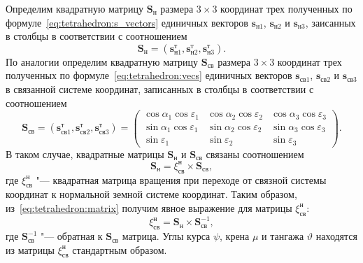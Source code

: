 \documentclass[../main.tex]{subfiles}
\begin{document}
Определим квадратную матрицу $\mathbf{S}_{\text{н}}$ размера $3 \times 3$ координат трех полученных по формуле~\eqref{eq:tetrahedron:s_vectors} единичных векторов $\mathbf{s}_{\text{н}1}$, $\mathbf{s}_{\text{н}2}$ и $\mathbf{s}_{\text{н}3}$, заисанных в столбцы в соответствии с соотношением
\begin{equation*}
    \mathbf{S}_{\text{н}} = \left(\mathbf{s}_{\text{н}1}^\text{т}, \mathbf{s}_{\text{н}2}^\text{т}, \mathbf{s}_{\text{н}3}^\text{т}\right).
\end{equation*}
По аналогии определим квадратную матрицу $\mathbf{S}_{\text{св}}$ размера $3 \times 3$ координат трех полученных по формуле~\eqref{eq:tetrahedron:vecs} единичных векторов $\mathbf{s}_{\text{св}1}$, $\mathbf{s}_{\text{св}2}$ и $\mathbf{s}_{\text{св}3}$ в связанной системе координат, записанных в столбцы в соответствии с соотношением
\begin{equation*}
    \mathbf{S}_{\text{св}} = \left(\mathbf{s}_{\text{св}1}^\text{т}, \mathbf{s}_{\text{св}2}^\text{т}, \mathbf{s}_{\text{св}3}^\text{т}\right) =
    \left(\begin{matrix}
      \cos\alpha_1\cos\varepsilon_1 & \cos\alpha_2\cos\varepsilon_2 & \cos\alpha_3 \cos\varepsilon_3 \\
      \sin\alpha_1\cos\varepsilon_1 & \sin\alpha_2\cos\varepsilon_2 & \sin\alpha_3 \cos\varepsilon_3 \\
      \sin\varepsilon_1 & \sin\varepsilon_2 & \sin\varepsilon_3
    \end{matrix}\right).
\end{equation*}
В таком случае, квадратные матрицы $\mathbf{S}_{\text{н}}$ и $\mathbf{S}_{\text{св}}$ связаны соотношением
\begin{equation}\label{eq:tetrahedron:matrix}
    \mathbf{S}_{\text{н}} = \xi_{\text{св}}^{\text{н}} \times \mathbf{S}_{\text{св}},
\end{equation}
где $\xi_{\text{св}}^{\text{н}}$ "--- квадратная матрица вращения при переходе от связной системы координат к нормальной земной системе координат. Таким образом, из~\eqref{eq:tetrahedron:matrix} получим явное выражение для матрицы $\xi_{\text{св}}^{\text{н}}$:
\begin{equation*}
    \xi_{\text{св}}^{\text{н}} = \mathbf{S}_{\text{н}} \times \mathbf{S}_{\text{св}}^{-1},
\end{equation*}
где $\mathbf{S}_{\text{св}}^{-1}$ "--- обратная к $\mathbf{S}_{\text{св}}$ матрица. Углы курса $\psi$, крена $\mu$ и тангажа $\vartheta$ находятся из матрицы $\xi_{\text{св}}^{\text{н}}$ стандартным образом.
\end{document}
